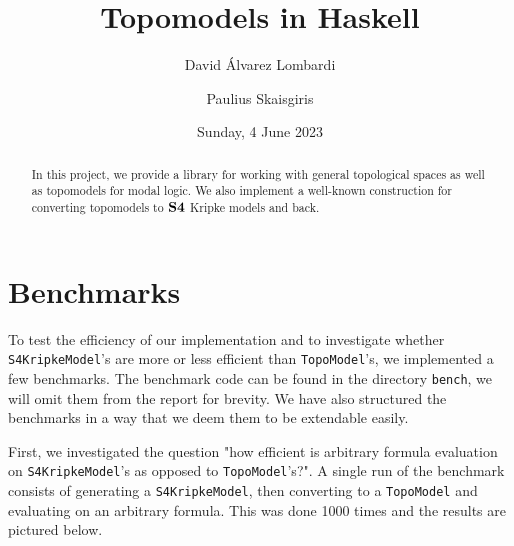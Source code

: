 \documentclass[12pt,a4paper]{article}
\title{Topomodels in Haskell}
\author{David Álvarez Lombardi \and Paulius Skaisgiris}
\date{Sunday, 4 June 2023}
\begin{document}
\maketitle

\begin{abstract}
In this project, we provide a library for working with general topological spaces as well as topomodels for modal logic.
We also implement a well-known construction for converting topomodels to $\mathbf{S4}$ Kripke models and back.
\end{abstract}

\tableofcontents

\clearpage
























\section{Benchmarks}

To test the efficiency of our implementation and to investigate whether \verb|S4KripkeModel|'s
are more or less efficient than \verb|TopoModel|'s, we implemented a few benchmarks. The benchmark code
can be found in the directory \verb|bench|, we will omit them from the report for brevity. We have also
structured the benchmarks in a way that we deem them to be extendable easily.

First, we investigated the question "how efficient is arbitrary formula evaluation on \verb|S4KripkeModel|'s
as opposed to \verb|TopoModel|'s?". A single run of the benchmark consists of generating a \verb|S4KripkeModel|,
then converting to a \verb|TopoModel| and evaluating on an arbitrary formula. This was done 1000 times and the
results are pictured below.
\end{document}
